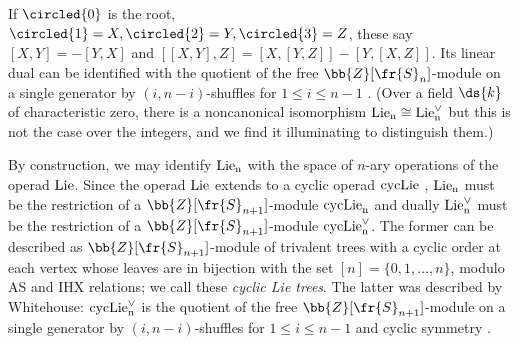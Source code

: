 \documentclass[a4paper]{amsart}
\begin{document}
If $\circled{0}$ is the root, $\circled{1} = X,\circled{2} = Y,\circled{3}=Z$, these say $[X,Y] = -[Y,X]$ and $[[X,Y],Z]= [X,[Y,Z]] -[Y,[X,Z]]$. Its linear dual can be identified with the quotient of the free $\bb{Z}[\fr{S}_n]$-module on a single generator by $(i,n-i)$-shuffles for $1 \leq i \leq n-1$ \cite[Theorem 2.6]{Whitehouse}. (Over a field $\ds{k}$ of characteristic zero, there is a noncanonical isomorphism $\rm{Lie}_n \cong \rm{Lie}_n^\vee$ but this is not the case over the integers, and we find it illuminating to distinguish them.)

By construction, we may identify $\rm{Lie}_n$ with the space of $n$-ary operations of the operad $\rm{Lie}$. Since the operad $\rm{Lie}$ extends to a cyclic operad $\rm{cycLie}$ \cite[3.9(c)]{GetzlerKapranov}, $\rm{Lie}_n$ must be the restriction of a $\bb{Z}[\fr{S}_{n+1}]$-module $\rm{cycLie}_n$ and dually $\rm{Lie}^\vee_n$ must be the restriction of a $\bb{Z}[\fr{S}_{n+1}]$-module $\rm{cycLie}^\vee_n$. The former can be described as $\bb{Z}[\fr{S}_{n+1}]$-module of trivalent trees with a cyclic order at each vertex whose leaves are in bijection with the set $[n] = \{0,1,\ldots,n\}$, modulo AS and IHX relations; we call these \emph{cyclic Lie trees}. The latter was described by Whitehouse: $\rm{cycLie}^\vee_n$ is the quotient of the free $\bb{Z}[\fr{S}_{n+1}]$-module on a single generator by $(i,n-i)$-shuffles for $1 \leq i \leq n-1$ and cyclic symmetry \cite[p.~317, 319]{Whitehouse}.
\end{document}
